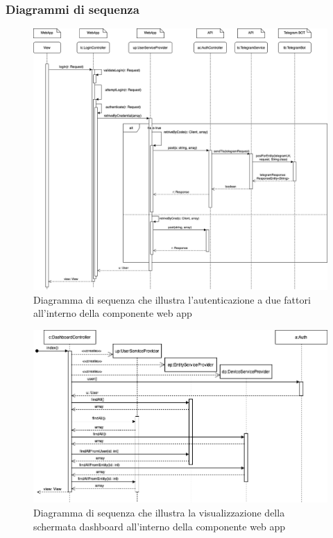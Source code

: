 \begin{landscape}
	\subsubsection{Diagrammi di sequenza}%
		\begin{figure}[H]
			\centering
			\includegraphics[scale=0.500]{res/images/WEBAPP/AutenticazioneTfa.png}
			\caption{Diagramma di sequenza che illustra l'autenticazione a due fattori all'interno della componente web app}
			\label{Diagramma 23}
		\end{figure}
		\begin{figure}[H]
			\centering
			\includegraphics[scale=0.600]{res/images/WEBAPP/Dashboard.index.png}
			\caption{Diagramma di sequenza che illustra la visualizzazione della schermata dashboard all'interno della componente web app}
			\label{Diagramma 24}
		\end{figure}
	\end{landscape}
